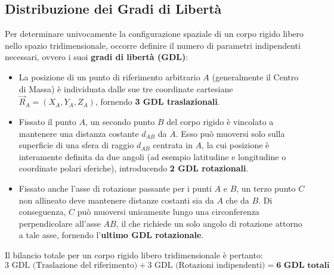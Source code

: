 \subsection{Distribuzione dei Gradi di Libertà}
Per determinare univocamente la configurazione spaziale di un corpo rigido libero nello spazio tridimensionale, occorre definire il numero di parametri indipendenti necessari, ovvero i suoi \textbf{gradi di libertà (GDL)}:
\begin{itemize}
    \item La posizione di un punto di riferimento arbitrario $A$ (generalmente il Centro di Massa) è individuata dalle sue tre coordinate cartesiane $\vec{R}_A = (X_A, Y_A, Z_A)$, fornendo \textbf{3 GDL traslazionali}.
    \item Fissato il punto $A$, un secondo punto $B$ del corpo rigido è vincolato a mantenere una distanza costante $d_{AB}$ da $A$. Esso può muoversi solo sulla superficie di una sfera di raggio $d_{AB}$ centrata in $A$, la cui posizione è interamente definita da due angoli (ad esempio latitudine e longitudine o coordinate polari sferiche), introducendo \textbf{2 GDL rotazionali}.
    \item Fissato anche l'asse di rotazione passante per i punti $A$ e $B$, un terzo punto $C$ non allineato deve mantenere distanze costanti sia da $A$ che da $B$. Di conseguenza, $C$ può muoversi unicamente lungo una circonferenza perpendicolare all'asse $AB$, il che richiede un solo angolo di rotazione attorno a tale asse, fornendo l'\textbf{ultimo GDL rotazionale}.
\end{itemize}

Il bilancio totale per un corpo rigido libero tridimensionale è pertanto:
\begin{equation*}
    \text{3 GDL (Traslazione del riferimento)} + \text{3 GDL (Rotazioni indipendenti)} = \textbf{6 GDL totali}
\end{equation*}

